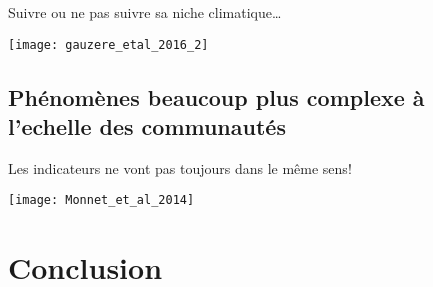 \documentclass[10pt]{beamer}
\begin{document}
\begin{frame}{Suivre ou ne pas suivre sa niche climatique…}
  \begin{center}

      \texttt{[image: gauzere\_etal\_2016\_2]}
  \end{center}

  \begin{tiny}
   \cite{Gauzere2016}
  \end{tiny}
\end{frame}




\subsection{Phénomènes beaucoup plus complexe à l'echelle des communautés}




\begin{frame}{Les indicateurs ne vont pas toujours dans le même sens!}
 \begin{center}
   \texttt{[image: Monnet\_et\_al\_2014]}
 \end{center}

 \begin{tiny}
    \cite{Monnet2014}
  \end{tiny}
\end{frame}


 \section{Conclusion}
\end{document}
